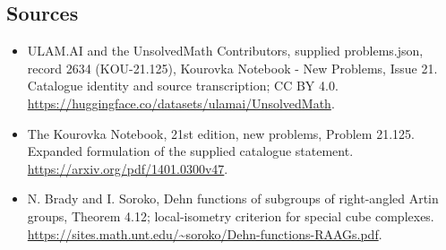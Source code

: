 \documentclass[11pt,a4paper]{article}
\begin{document}
\subsection{Sources}
\begin{itemize}
\item[S1] ULAM.AI and the UnsolvedMath Contributors, supplied problems.json, record 2634 (KOU-21.125), Kourovka Notebook - New Problems, Issue 21. Catalogue identity and source transcription; CC BY 4.0.
\url{https://huggingface.co/datasets/ulamai/UnsolvedMath}.
\item[S2] The Kourovka Notebook, 21st edition, new problems, Problem 21.125. Expanded formulation of the supplied catalogue statement.
\url{https://arxiv.org/pdf/1401.0300v47}.
\item[S3] N. Brady and I. Soroko, Dehn functions of subgroups of right-angled Artin groups, Theorem 4.12; local-isometry criterion for special cube complexes.
\url{https://sites.math.unt.edu/~soroko/Dehn-functions-RAAGs.pdf}.
\end{itemize}
\end{document}
